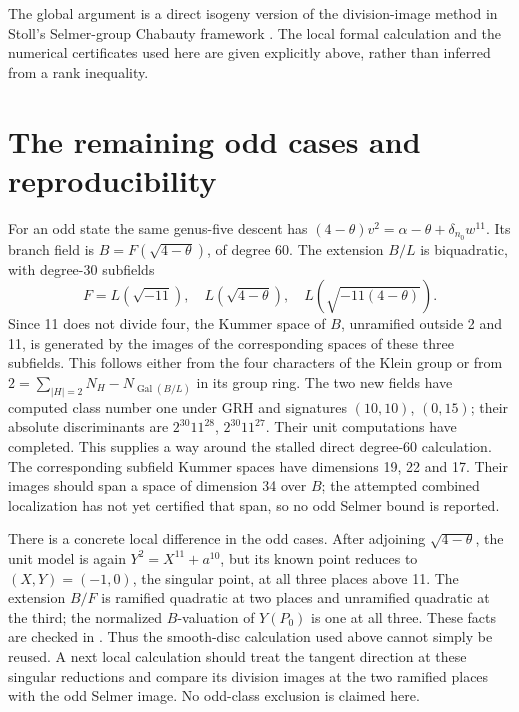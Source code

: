 \documentclass[11pt]{article}
\begin{document}
The global argument is a direct isogeny version of the division-image
method in Stoll's Selmer-group Chabauty framework \cite[Section~2]{stoll}.
The local formal calculation and the numerical certificates used here
are given explicitly above, rather than inferred from a rank inequality.

\section{The remaining odd cases and reproducibility}
For an odd state the same genus-five descent has
\((4-\theta)v^2=\alpha-\theta+\delta_{n_0}w^{11}\).
Its branch field is \(B=F(\sqrt{4-\theta})\), of degree 60.
The extension \(B/L\) is biquadratic, with degree-30 subfields
\[
 F=L(\sqrt{-11}),\quad L(\sqrt{4-\theta}),\quad
 L(\sqrt{-11(4-\theta)}).
\]
Since 11 does not divide four, the Kummer space of \(B\), unramified
outside 2 and 11, is generated by the images of the corresponding
spaces of these three subfields. This follows either from the four
characters of the Klein group or from
\(2=\sum_{|H|=2}N_H-N_{\operatorname{Gal}(B/L)}\) in its group ring.
The two new fields have computed class number one under GRH and
signatures \((10,10)\), \((0,15)\); their absolute discriminants are
\(2^{30}11^{28}\), \(2^{30}11^{27}\). Their unit computations have
completed. This supplies a way around the stalled direct degree-60
calculation. The corresponding subfield Kummer spaces have dimensions
19, 22 and 17. Their images should span a space of dimension 34 over
\(B\); the attempted combined localization has not yet certified that
span, so no odd Selmer bound is reported.

There is a concrete local difference in the odd cases. After adjoining
\(\sqrt{4-\theta}\), the unit model is again
\(Y^2=X^{11}+a^{10}\), but its known point reduces to
\((X,Y)=(-1,0)\), the singular point, at all three places above 11.
The extension \(B/F\) is ramified quadratic at two places and unramified
quadratic at the third; the normalized \(B\)-valuation of \(Y(P_0)\)
is one at all three. These facts are checked in
. Thus the smooth-disc calculation used
above cannot simply be reused. A next local calculation should treat
the tangent direction at these singular reductions and compare its
division images at the two ramified places with the odd Selmer image.
No odd-class exclusion is claimed here.
\end{document}

